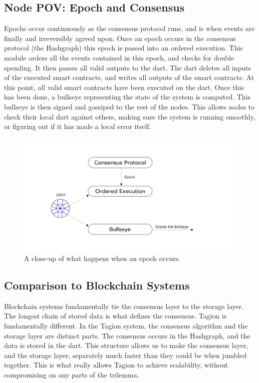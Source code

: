 \pagebreak

\subsection{Node POV: Epoch and Consensus}
    Epochs occur continuously as the consensus protocol runs, and is when events are finally and irreversibly agreed upon. Once an epoch occurs in the consensus protocol (the Hashgraph) this epoch is passed into an ordered execution. This module orders all the events contained in this epoch, and checks for double spending. It then passes all valid outputs to the \gls{dart}. The \gls{dart} deletes all inputs of the executed smart contracts, and writes all outputs of the smart contracts. At this point, all valid smart contracts have been executed on the \gls{dart}. Once this has been done, a \gls{bullseye} representing the state of the system is computed. This \gls{bullseye} is then signed and gossiped to the rest of the nodes. This allows nodes to check their local \gls{dart} against others, making sure the system is running smoothly, or figuring out if it has made a local error itself.
    \begin{figure}[H]
        \centering
        \includegraphics[width=1.2\textwidth,center]{figures/epoch_zoom.jpeg}
        \caption{A close-up of what happens when an epoch occurs.}
        \label{figure:epoch_zoom}
    \end{figure}

\subsection{Comparison to Blockchain Systems}
    Blockchain systems fundamentally tie the consensus layer to the storage layer. The longest chain of stored data is what defines the consensus. Tagion is fundamentally different. In the Tagion system, the consensus algorithm and the storage layer are distinct parts. The consensus occurs in the Hashgraph, and the data is stored in the \gls{dart}. This structure allows us to make the consensus layer, and the storage layer, separately much faster than they could be when jumbled together. This is what really allows Tagion to achieve scalability, without compromising on any parts of the \gls{trilemma}.

\pagebreak